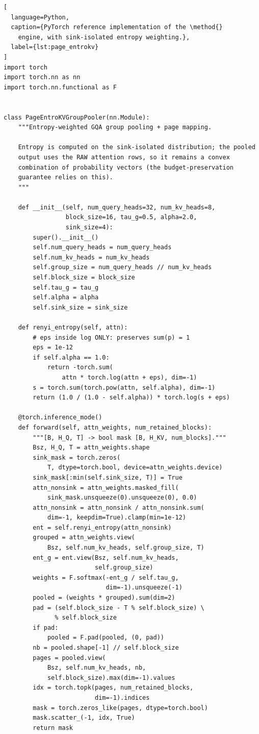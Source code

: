 \documentclass[final,5p,times,twocolumn]{elsarticle}
\theoremstyle{definition}
\theoremstyle{remark}
\newcommand{\method}{Page-EntroKV}
\begin{document}
\begin{lstlisting}[
  language=Python,
  caption={PyTorch reference implementation of the \method{}
    engine, with sink-isolated entropy weighting.},
  label={lst:page_entrokv}
]
import torch
import torch.nn as nn
import torch.nn.functional as F


class PageEntroKVGroupPooler(nn.Module):
    """Entropy-weighted GQA group pooling + page mapping.

    Entropy is computed on the sink-isolated distribution; the pooled
    output uses the RAW attention rows, so it remains a convex
    combination of probability vectors (the budget-preservation
    guarantee relies on this).
    """

    def __init__(self, num_query_heads=32, num_kv_heads=8,
                 block_size=16, tau_g=0.5, alpha=2.0,
                 sink_size=4):
        super().__init__()
        self.num_query_heads = num_query_heads
        self.num_kv_heads = num_kv_heads
        self.group_size = num_query_heads // num_kv_heads
        self.block_size = block_size
        self.tau_g = tau_g
        self.alpha = alpha
        self.sink_size = sink_size

    def renyi_entropy(self, attn):
        # eps inside log ONLY: preserves sum(p) = 1
        eps = 1e-12
        if self.alpha == 1.0:
            return -torch.sum(
                attn * torch.log(attn + eps), dim=-1)
        s = torch.sum(torch.pow(attn, self.alpha), dim=-1)
        return (1.0 / (1.0 - self.alpha)) * torch.log(s + eps)

    @torch.inference_mode()
    def forward(self, attn_weights, num_retained_blocks):
        """[B, H_Q, T] -> bool mask [B, H_KV, num_blocks]."""
        Bsz, H_Q, T = attn_weights.shape
        sink_mask = torch.zeros(
            T, dtype=torch.bool, device=attn_weights.device)
        sink_mask[:min(self.sink_size, T)] = True
        attn_nonsink = attn_weights.masked_fill(
            sink_mask.unsqueeze(0).unsqueeze(0), 0.0)
        attn_nonsink = attn_nonsink / attn_nonsink.sum(
            dim=-1, keepdim=True).clamp(min=1e-12)
        ent = self.renyi_entropy(attn_nonsink)
        grouped = attn_weights.view(
            Bsz, self.num_kv_heads, self.group_size, T)
        ent_g = ent.view(Bsz, self.num_kv_heads,
                         self.group_size)
        weights = F.softmax(-ent_g / self.tau_g,
                            dim=-1).unsqueeze(-1)
        pooled = (weights * grouped).sum(dim=2)
        pad = (self.block_size - T % self.block_size) \
              % self.block_size
        if pad:
            pooled = F.pad(pooled, (0, pad))
        nb = pooled.shape[-1] // self.block_size
        pages = pooled.view(
            Bsz, self.num_kv_heads, nb,
            self.block_size).max(dim=-1).values
        idx = torch.topk(pages, num_retained_blocks,
                         dim=-1).indices
        mask = torch.zeros_like(pages, dtype=torch.bool)
        mask.scatter_(-1, idx, True)
        return mask
\end{lstlisting}
\end{document}
